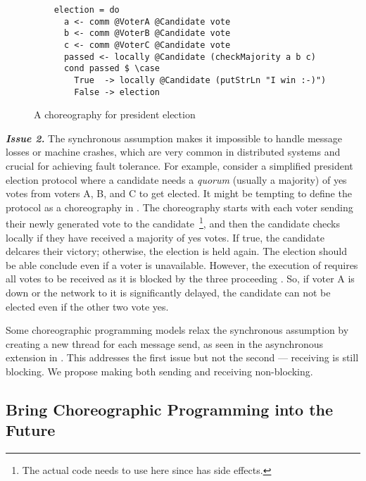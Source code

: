 \begin{figure}[th]
  \begin{verbatim}
    election = do
      a <- comm @VoterA @Candidate vote
      b <- comm @VoterB @Candidate vote
      c <- comm @VoterC @Candidate vote
      passed <- locally @Candidate (checkMajority a b c)
      cond passed $ \case
        True  -> locally @Candidate (putStrLn "I win :-)")
        False -> election
  \end{verbatim}
  \caption{A choreography for president election}
  \label{fig:election}
\end{figure}

\textit{\textbf{Issue 2.}} The synchronous assumption makes it impossible to handle message losses or machine crashes, which are very common in distributed systems and crucial for achieving fault tolerance.
%
For example, consider a simplified president election protocol where a candidate needs a \emph{quorum} (usually a majority) of yes votes from voters A, B, and C to get elected.
%
It might be tempting to define the protocol as a choreography in .
%
The  choreography starts with each voter sending their newly generated vote to the candidate~\footnote{The actual code needs to use  here since  has side effects.}, and then the candidate checks locally if they have received a majority of yes votes.
%
If true, the candidate delcares their victory; otherwise, the election is held again.
%
The election should be able conclude even if a voter is unavailable.
%
However, the execution of  requires all votes to be received as it is blocked by the three proceeding .
%
So, if voter A is down or the network to it is significantly delayed, the candidate can not be elected even if the other two vote yes.

Some choreographic programming models relax the synchronous assumption by creating a new thread for each message send, as seen in the asynchronous extension in \citet{montesi-textbook}.
%
This addresses the first issue but not the second --- receiving is still blocking.
%
We propose making both sending and receiving non-blocking.

\subsection{Bring Choreographic Programming into the Future}

